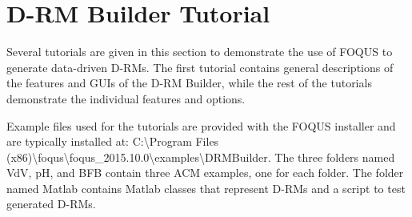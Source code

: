\section{D-RM Builder Tutorial}
\label{sec.drm.tut}
Several tutorials are given in this section to demonstrate the use of FOQUS to generate data-driven D-RMs.  The first tutorial contains general descriptions of the features and GUIs of the D-RM Builder, while the rest of the tutorials demonstrate the individual features and options.

Example files used for the tutorials are provided with the FOQUS installer and are typically installed at: C:\textbackslash Program Files (x86)\textbackslash foqus\textbackslash foqus\_2015.10.0\textbackslash examples\textbackslash DRMBuilder.  The three folders named VdV, pH, and BFB contain three ACM examples, one for each folder.  The folder named Matlab contains Matlab classes that represent D-RMs and a script to test generated D-RMs.

